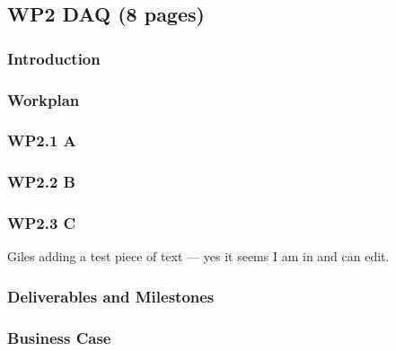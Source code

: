 \subsection{WP2 DAQ (8 pages)}

\subsubsection{Introduction}

\subsubsection{Workplan}

\subsubsection{WP2.1 A}
\subsubsection{WP2.2 B}
\subsubsection{WP2.3 C}

Giles adding a test piece of text --- yes it seems I am in and can edit.

\subsubsection{Deliverables and Milestones}

\subsubsection{Business Case}
